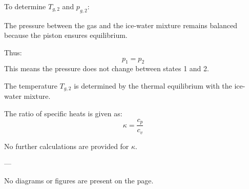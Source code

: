 To determine \( T_{g,2} \) and \( p_{g,2} \):  

The pressure between the gas and the ice-water mixture remains balanced because the piston ensures equilibrium.  

Thus:  
\[
p_1 = p_2
\]  
This means the pressure does not change between states 1 and 2.  

The temperature \( T_{g,2} \) is determined by the thermal equilibrium with the ice-water mixture.  

The ratio of specific heats is given as:  
\[
\kappa = \frac{c_p}{c_v}
\]  

No further calculations are provided for \( \kappa \).  

---

No diagrams or figures are present on the page.
